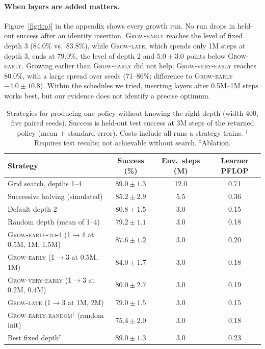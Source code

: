 \documentclass{article}
\newcommand{\growE}{\textsc{Grow-early}}
\newcommand{\growL}{\textsc{Grow-late}}
\newcommand{\growVE}{\textsc{Grow-very-early}}
\newcommand{\growF}{\textsc{Grow-early-to-4}}
\newcommand{\growR}{\textsc{Grow-early-random}}
\begin{document}
\paragraph{When layers are added matters.}
Figure~\ref{fig:traj} in the appendix shows every growth run.
No run drops in held-out success after an identity insertion.
\growE{} reaches the level of fixed depth 3 (84.0\% vs.\ 83.8\%), while \growL{}, which spends only 1M steps at depth 3, ends at 79.0\%, the level of depth 2 and $5.0 \pm 3.0$ points below \growE{}.
Growing earlier than \growE{} did not help: \growVE{} reaches 80.0\%, with a large spread over seeds (71--86\%; difference to \growE{} $-4.0 \pm 10.8$).
Within the schedules we tried, inserting layers after 0.5M--1M steps works best, but our evidence does not identify a precise optimum.

\begin{table}[!t]
    \caption{Strategies for producing one policy without knowing the right depth (width 400, five paired seeds). Success is held-out test success at 3M steps of the returned policy (mean $\pm$ standard error). Costs include all runs a strategy trains. $^\dagger$Requires test results; not achievable without search. $^\ddagger$Ablation.}
    \label{tab:main}
    \centering
    \small
    \begin{tabular}{lccc}
        \toprule
        Strategy & Success (\%) & Env.\ steps (M) & Learner PFLOP \\
        \midrule
        Grid search, depths 1--4          & $89.0 \pm 1.3$ & 12.0 & 0.71 \\
        Successive halving (simulated)    & $85.2 \pm 2.9$ & 5.5  & 0.36 \\
        Default depth 2                   & $80.8 \pm 1.5$ & 3.0  & 0.15 \\
        Random depth (mean of 1--4)       & $79.2 \pm 1.1$ & 3.0  & 0.18 \\
        \midrule
        \growF{} (1$\to$4 at 0.5M, 1M, 1.5M) & $\mathbf{87.6 \pm 1.2}$ & 3.0 & 0.20 \\
        \growE{} (1$\to$3 at 0.5M, 1M)    & $84.0 \pm 1.7$ & 3.0  & 0.18 \\
        \growVE{} (1$\to$3 at 0.2M, 0.4M) & $80.0 \pm 2.7$ & 3.0  & 0.19 \\
        \growL{} (1$\to$3 at 1M, 2M)      & $79.0 \pm 1.5$ & 3.0  & 0.15 \\
        \growR{}$^\ddagger$ (random init)  & $75.4 \pm 2.0$ & 3.0  & 0.18 \\
        \midrule
        Best fixed depth$^\dagger$        & $89.0 \pm 1.3$ & 3.0  & 0.23 \\
        \bottomrule
    \end{tabular}
\end{table}
\end{document}
